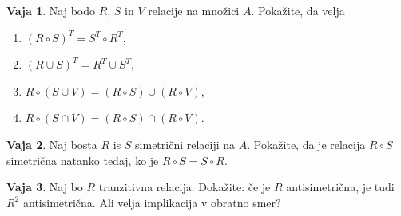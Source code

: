 \documentclass{article}
\theoremstyle{definition}
\newtheorem{vaja}{Vaja}
\begin{document}
\begin{vaja}
Naj bodo $R$, $S$ in $V$ relacije na množici $A$. Pokažite, da velja
\begin{enumerate}
\item $(R \circ S)^T = S^T \circ R^T$,
\item $(R \cup S)^T = R^T \cup S^T$,
\item $R \circ (S \cup V) = (R \circ S) \cup (R \circ V)$,
\item $R \circ (S \cap V) = (R \circ S) \cap (R \circ V)$.
\end{enumerate}
\end{vaja}

\begin{vaja}
Naj bosta $R$ is $S$ simetrični relaciji na $A$. Pokažite, da je relacija $R \circ S$ simetrična natanko tedaj, ko je $R \circ S = S \circ R$.
\end{vaja}

\begin{vaja}
Naj bo $R$ tranzitivna relacija. Dokažite: če je $R$ antisimetrična, je tudi $R^2$ antisimetrična. Ali velja implikacija v obratno smer?
\end{vaja}
\end{document}

